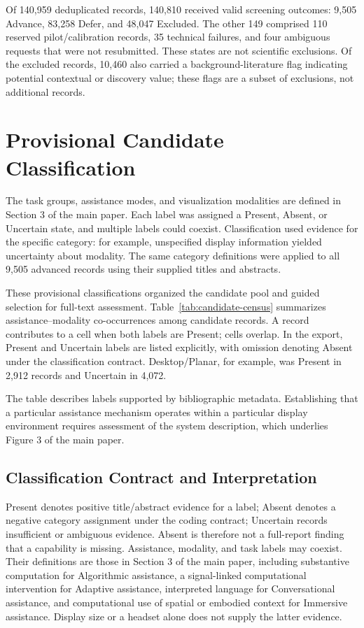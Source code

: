 \documentclass[11pt]{article}
\begin{document}
Of 140,959 deduplicated records, 140,810 received valid screening outcomes: 9,505 Advance, 83,258 Defer, and 48,047 Excluded. The other 149 comprised 110 reserved pilot/calibration records, 35 technical failures, and four ambiguous requests that were not resubmitted. These states are not scientific exclusions. Of the excluded records, 10,460 also carried a background-literature flag indicating potential contextual or discovery value; these flags are a subset of exclusions, not additional records.


\section{Provisional Candidate Classification}
The task groups, assistance modes, and visualization modalities are defined in Section 3 of the main paper. Each label was assigned a Present, Absent, or Uncertain state, and multiple labels could coexist. Classification used evidence for the specific category: for example, unspecified display information yielded uncertainty about modality. The same category definitions were applied to all 9,505 advanced records using their supplied titles and abstracts.

These provisional classifications organized the candidate pool and guided selection for full-text assessment. Table~\ref{tab:candidate-census} summarizes assistance--modality co-occurrences among candidate records. A record contributes to a cell when both labels are Present; cells overlap. In the export, Present and Uncertain labels are listed explicitly, with omission denoting Absent under the classification contract. Desktop/Planar, for example, was Present in 2,912 records and Uncertain in 4,072.

The table describes labels supported by bibliographic metadata. Establishing that a particular assistance mechanism operates within a particular display environment requires assessment of the system description, which underlies Figure 3 of the main paper.

\subsection{Classification Contract and Interpretation}
Present denotes positive title/abstract evidence for a label; Absent denotes a negative category assignment under the coding contract; Uncertain records insufficient or ambiguous evidence. Absent is therefore not a full-report finding that a capability is missing. Assistance, modality, and task labels may coexist. Their definitions are those in Section 3 of the main paper, including substantive computation for Algorithmic assistance, a signal-linked computational intervention for Adaptive assistance, interpreted language for Conversational assistance, and computational use of spatial or embodied context for Immersive assistance. Display size or a headset alone does not supply the latter evidence.
\end{document}
